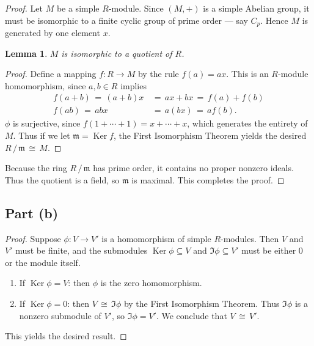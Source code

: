 \documentclass[11pt]{article}
\newtheorem{lemma}{Lemma}
\newcommand{\Ker}{\operatorname{Ker}}
\begin{document}
\begin{proof}
  Let $M$ be a simple $R$-module. Since $(M, +)$ is a simple Abelian group, it must be isomorphic to a finite cyclic group of prime order --- say $C_{p}$. Hence $M$ is generated by one element $x$.
  
  \begin{adjustwidth}{0.5cm}{}
    \begin{lemma}
      $M$ is isomorphic to a quotient of $R$.
    \end{lemma}
    \begin{proof}\renewcommand{\qedsymbol}{}
      Define a mapping $f : R \to M$ by the rule $f(a) = ax$. This is an $R$-module homomorphism, since $a, b \in R$ implies
      \begin{align*}
        f(a + b) \, = \, (a + b)x \, &= \, ax + bx \, = \, f(a) + f(b) \\
        f(ab) \, = \, abx \, &= \, a(bx) \, = \, a f(b).
      \end{align*}
      $\phi$ is surjective, since $f(1 + \cdots + 1) = x + \cdots + x$, which generates the entirety of $M$. Thus if we let $\mathfrak{m} = \Ker f$, the First Isomorphism Theorem yields the desired $R \, / \, \mathfrak{m} \, \cong \, M$.
    \end{proof}
  \end{adjustwidth}
  
  Because the ring $R \, / \, \mathfrak{m}$ has prime order, it contains no proper nonzero ideals. Thus the quotient is a field, so $\mathfrak{m}$ is maximal. This completes the proof.
\end{proof}


\subsection{Part (b)}

\begin{proof}
  Suppose $\phi : V \to V'$ is a homomorphism of simple $R$-modules. Then $V$ and $V'$ must be finite, and the submodules $\Ker \phi \subseteq V$ and $\Im \phi \subseteq V'$ must be either $0$ or the module itself.
  \begin{enumerate}
    \item If $\Ker \phi = V$: then $\phi$ is the zero homomorphism.
    \item If $\Ker \phi = 0$: then $V \, \cong \, \Im \phi$ by the First Isomorphism Theorem. Thus $\Im \phi$ is a nonzero submodule of $V'$, so $\Im \phi = V'$. We conclude that $V \, \cong \, V'$.
  \end{enumerate}
  This yields the desired result.
\end{proof}
\end{document}
